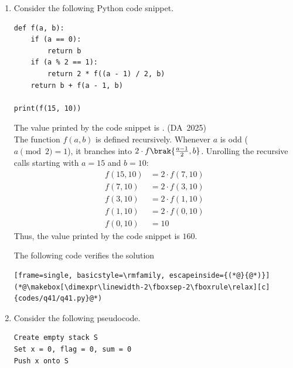 \begin{enumerate}[label=\thesubsection.\arabic*, ref=\thesubsection.\theenumi]
The following code verifies the solution
\begin{lstlisting}[frame=single, basicstyle=\rmfamily, escapeinside={(*@}{@*)}]
(*@\makebox[\dimexpr\linewidth-2\fboxsep-2\fboxrule\relax][c]{codes/q40/q40.c}@*)
\end{lstlisting}
\item 
Consider the following Python code snippet.
\begin{lstlisting}[frame=single, basicstyle=\rmfamily, xleftmargin=0pt]
def f(a, b):
	if (a == 0):
		return b
	if (a % 2 == 1):
		return 2 * f((a - 1) / 2, b)
	return b + f(a - 1, b)
	
print(f(15, 10))
\end{lstlisting}
The value printed by the code snippet is \underline{\hspace{1.5cm}}.
\hfill (DA~2025)
\\
\solution
The function $f(a, b)$ is defined recursively. Whenever $a$ is odd ($a \pmod 2 = 1$), it branches into $2 \cdot f\brak{\frac{a-1}{2}, b}$. Unrolling the recursive calls starting with $a = 15$ and $b = 10$:
\begin{align}
	f(15, 10) &= 2 \cdot f(7, 10) \\
	f(7, 10)  &= 2 \cdot f(3, 10) \\
	f(3, 10)  &= 2 \cdot f(1, 10) \\
	f(1, 10)  &= 2 \cdot f(0, 10) \\
	f(0, 10)  &= 10
\end{align}
Thus, the value printed by the code snippet is $160$.

The following code verifies the solution
\begin{lstlisting}[frame=single, basicstyle=\rmfamily, escapeinside={(*@}{@*)}]
(*@\makebox[\dimexpr\linewidth-2\fboxsep-2\fboxrule\relax][c]{codes/q41/q41.py}@*)
\end{lstlisting}
\item 
Consider the following pseudocode.
\begin{lstlisting}[frame=single, basicstyle=\rmfamily, xleftmargin=0pt]
Create empty stack S
Set x = 0, flag = 0, sum = 0
Push x onto S
	

\end{lstlisting}
\end{enumerate}
